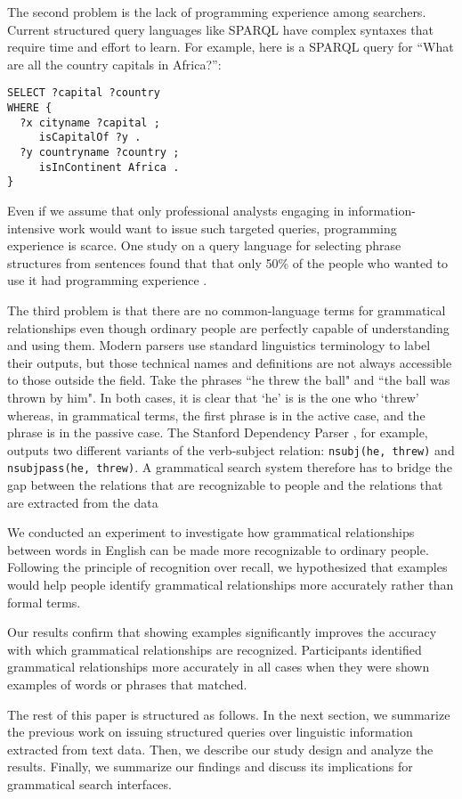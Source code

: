 \documentclass{sigchi}
\newcommand{\code}[1] {\texttt{#1}}
\begin{document}
The second problem is the lack of programming experience among searchers. Current structured query languages like SPARQL have complex syntaxes that require time and effort to learn. For example, here is a SPARQL query for ``What are all the country capitals in Africa?'':
\begin{verbatim}
SELECT ?capital ?country
WHERE {
  ?x cityname ?capital ;
     isCapitalOf ?y .
  ?y countryname ?country ;
     isInContinent Africa .
}
\end{verbatim}
Even if we assume that only professional analysts engaging in information-intensive work would want to issue such targeted queries,  programming experience is scarce. One study on a query language for selecting phrase structures from sentences found that that only 50\% of the people who wanted to use it had programming experience \cite{}.

The third problem is that there are no common-language terms for grammatical relationships even though ordinary people are perfectly capable of understanding and using them. Modern parsers use standard linguistics terminology to label their outputs, but those technical names and definitions are not always accessible to those outside the field. Take the phrases ``he threw the ball" and ``the ball was thrown by him". In both cases, it is clear that `he' is is the one who `threw' whereas, in grammatical terms, the first phrase is in the active case, and the phrase is in the passive case. The Stanford Dependency Parser \cite{}, for example, outputs two different variants of the verb-subject relation: \code{nsubj(he, threw)} and \code{nsubjpass(he, threw)}. A grammatical search system therefore has to bridge the gap between the relations that are recognizable to people and the relations that are extracted from the data

We conducted an experiment to investigate how grammatical relationships between words in English can be made more recognizable to ordinary people. Following the principle of recognition over recall, we hypothesized that examples would help people identify grammatical relationships more accurately rather than formal terms. 

Our results confirm that showing examples significantly improves the accuracy with which grammatical relationships are recognized. Participants identified grammatical relationships more accurately in all cases when they were  shown examples of words or phrases that matched. 

The rest of this paper is structured as follows. In the next section, we summarize the previous work on issuing structured queries over linguistic information extracted from text data. Then, we  describe our study design and analyze the results. Finally, we summarize our findings and discuss its implications for grammatical search interfaces.
\end{document}
